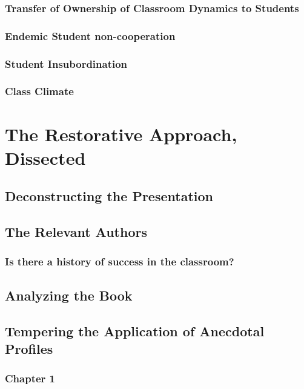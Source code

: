 \documentclass[12pt]{article}
\begin{document}
	\subsubsection{Transfer of Ownership of Classroom Dynamics to Students}
	\subsubsection{Endemic Student non-cooperation}
	\subsubsection{Student Insubordination}
	\subsubsection{Class Climate }
	
	
	\section{The Restorative Approach, Dissected}
	\subsection{Deconstructing the Presentation}
	\subsection{The Relevant Authors}
	\subsubsection{Is there a history of success in the classroom?}
	\subsection{Analyzing the Book}
	\subsection{Tempering the Application of Anecdotal Profiles}
	\subsubsection{Chapter 1}
\end{document}
